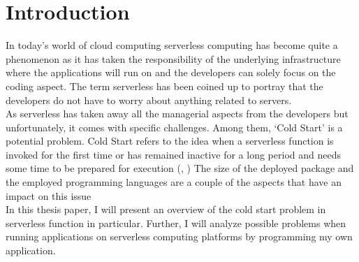 %
\section{Introduction}\label{sec:introduction}
%
In today's world of cloud computing serverless computing has become quite a phenomenon as it has taken the responsibility of the underlying infrastructure where the applications will run on and the developers can solely focus on the coding aspect. The term serverless has been coined up to portray that the developers do not have to worry about anything related to servers.\\

As serverless has taken away all the managerial aspects from the developers but unfortunately, it comes with specific challenges. Among them, ‘Cold Start’ is a potential problem. Cold Start refers to the idea when a serverless function is invoked for the first time or has remained inactive for a long period and needs some time to be prepared for execution (\cite{MSD+19}, \cite{SA20}) The size of the deployed package and the employed programming languages are a couple of the aspects that have an impact on this issue \cite{MEH+18}\\

In this thesis paper, I will present an overview of the cold start problem in serverless function
 in particular. Further, I will analyze possible problems when running applications on serverless computing platforms by programming my own application.\\
